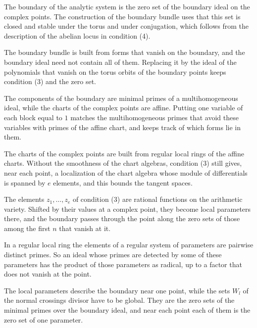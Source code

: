 The boundary of the analytic system is the zero set of the boundary ideal on the complex points. The construction of
the boundary bundle uses that this set is closed and stable under the torus and under conjugation, which follows
from the description of the abelian locus in condition (4).

The boundary bundle is built from forms that vanish on the boundary, and the boundary ideal need not contain all of
them. Replacing it by the ideal of the polynomials that vanish on the torus orbits of the boundary points keeps
condition (3) and the zero set.

The components of the boundary are minimal primes of a multihomogeneous ideal, while the charts of the complex points
are affine. Putting one variable of each block equal to $1$ matches the multihomogeneous primes that avoid these
variables with primes of the affine chart, and keeps track of which forms lie in them.

The charts of the complex points are built from regular local rings of the affine charts. Without the smoothness of
the chart algebras, condition (3) still gives, near each point, a localization of the chart algebra whose module of
differentials is spanned by $e$ elements, and this bounds the tangent spaces.

The elements $z_1,\dots,z_e$ of condition (3) are rational functions on the arithmetic variety. Shifted by their values
at a complex point, they become local parameters there, and the boundary passes through the point along the zero sets
of those among the first $n$ that vanish at it.

In a regular local ring the elements of a regular system of parameters are pairwise distinct primes. So an ideal whose
primes are detected by some of these parameters has the product of those parameters as radical, up to a factor that
does not vanish at the point.

The local parameters describe the boundary near one point, while the sets $W_l$ of the normal crossings divisor have to
be global. They are the zero sets of the minimal primes over the boundary ideal, and near each point each of them is the
zero set of one parameter.

